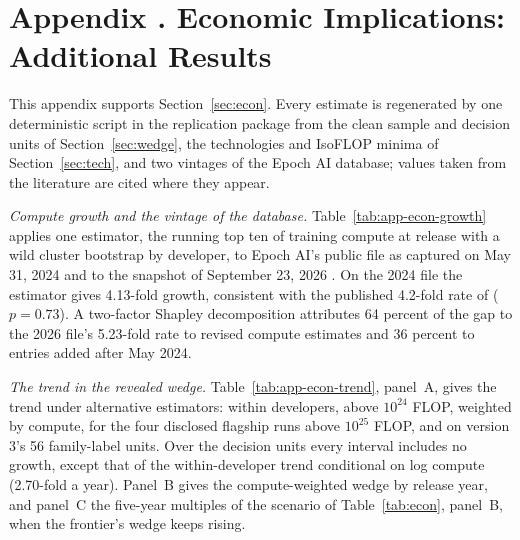 
\section[Economic Implications: Additional Results]{Appendix \thesection. Economic Implications: Additional Results}\label{app:econ}

This appendix supports Section~\ref{sec:econ}. Every estimate is regenerated by one deterministic script in the
replication package from the clean sample and decision units of Section~\ref{sec:wedge}, the technologies and IsoFLOP
minima of Section~\ref{sec:tech}, and two vintages of the Epoch AI database; values taken from the literature are cited
where they appear.

\textit{Compute growth and the vintage of the database.} Table~\ref{tab:app-econ-growth} applies one
estimator, the running top ten of training compute at release with a wild cluster bootstrap by developer, to Epoch AI's
public file as captured on May 31, 2024 \citep{epochai2024dataarchive} and to the snapshot of September 23, 2026
\citep{epochai2026data}. On the 2024 file the estimator gives 4.13-fold growth, consistent with the published 4.2-fold
rate of \citet{sevilla2024training} ($p=0.73$). A two-factor Shapley decomposition attributes 64 percent of the gap to
the 2026 file's 5.23-fold rate to revised compute estimates and 36 percent to entries added after May 2024.

\textit{The trend in the revealed wedge.} Table~\ref{tab:app-econ-trend}, panel~A, gives the trend under alternative
estimators: within developers, above $10^{24}$ FLOP, weighted by compute, for the four disclosed flagship runs above
$10^{25}$ FLOP, and on version 3's 56 family-label units. Over the decision units every interval includes no growth,
except that of the within-developer trend conditional on log compute (2.70-fold a year). Panel~B gives the
compute-weighted wedge by release year, and panel~C the five-year multiples of the scenario of Table~\ref{tab:econ},
panel~B, when the frontier's wedge keeps rising.

